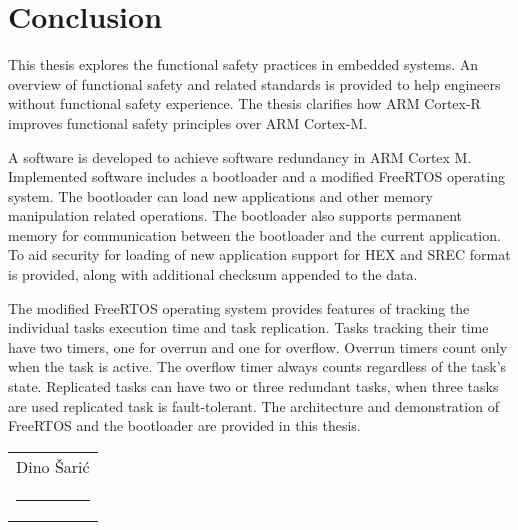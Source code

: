 \chapter{Conclusion}

This thesis explores the functional safety practices in embedded systems. An overview of functional safety and related standards is provided to help engineers without functional safety experience. The thesis clarifies how ARM Cortex-R improves functional safety principles over ARM Cortex-M. 

A software is developed to achieve software redundancy in ARM Cortex M. Implemented software includes a bootloader and a modified FreeRTOS operating system.  The bootloader can load new applications and other memory manipulation related operations. The bootloader also supports permanent memory for communication between the bootloader and the current application. To aid security for loading of new application support for HEX and SREC format is provided, along with additional checksum appended to the data.

The modified FreeRTOS operating system provides features of tracking the individual tasks execution time and task replication. Tasks tracking their time have two timers, one for overrun and one for overflow. Overrun timers count only when the task is active. The overflow timer always counts regardless of the task's state. Replicated tasks can have two or three redundant tasks, when three tasks are used replicated task is fault-tolerant. The architecture and demonstration of FreeRTOS and the bootloader are provided in this thesis.


\newcommand{\namesigdate}[2][5cm]{%
  \begin{tabular}{@{}p{#1}@{}}
    #2 \\[2\normalbaselineskip] \hrule \\[15pt]
  \end{tabular}}

\vspace*{\fill} \noindent \hfill \namesigdate{Dino Šarić}